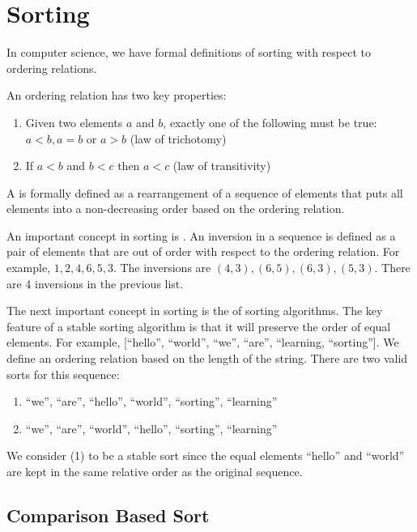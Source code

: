 
\chapter{Sorting}
\label{cha:sorting}

In computer science, we have formal definitions of sorting with respect to ordering relations.

An ordering relation has two key properties:
\begin{enumerate}
\item Given two elements \(a\) and \(b\), exactly one of the following must be true: \(a < b, a = b\) or \(a > b\) (law of trichotomy)
\item If \(a < b\) and \(b < c\) then \(a < c\) (law of transitivity)
\end{enumerate}



A  is formally defined as a rearrangement of a sequence of elements that puts all elements into a non-decreasing order based on the ordering relation.


An important concept in sorting is .
An inversion in a sequence is defined as a pair of elements that are out of order with respect to the ordering relation.
For example, \(1, 2, 4, 6, 5, 3\).
The inversions are \((4,3), (6,5), (6,3), (5,3)\).
There are 4 inversions in the previous list.


The next important concept in sorting is the  of sorting algorithms.
The key feature of a stable sorting algorithm is that it will preserve the order of equal elements.
For example, [“hello”, “world”, “we”, “are”, “learning, “sorting”].
We define an ordering relation based on the length of the string.
There are two valid sorts for this sequence:
\begin{enumerate}
\item “we”, “are”, “hello”, “world”, “sorting”, “learning”
\item “we”, “are”, “world”, “hello”, “sorting”, “learning”
\end{enumerate}

We consider (1) to be a stable sort since the equal elements “hello” and “world” are kept in the same relative order as the original sequence.



\section{Comparison Based Sort}
\label{sec:comp-based-sort}

